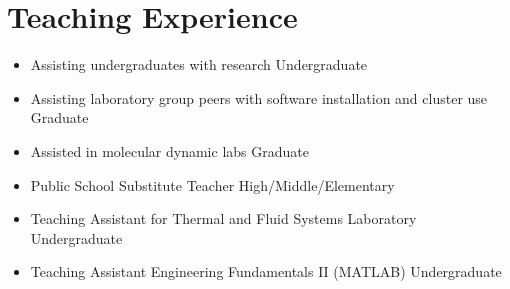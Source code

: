 \section{Teaching Experience}

\begin{itemize}
    \item Assisting undergraduates with research \hfill Undergraduate
    \item Assisting laboratory group peers with software installation and cluster use \hfill Graduate
    \item Assisted in molecular dynamic labs \hfill Graduate
    \item Public School Substitute Teacher \hfill High/Middle/Elementary
    \item Teaching Assistant for Thermal and Fluid Systems Laboratory \hfill Undergraduate
    \item Teaching Assistant Engineering Fundamentals II (MATLAB) \hfill Undergraduate
\end{itemize}
